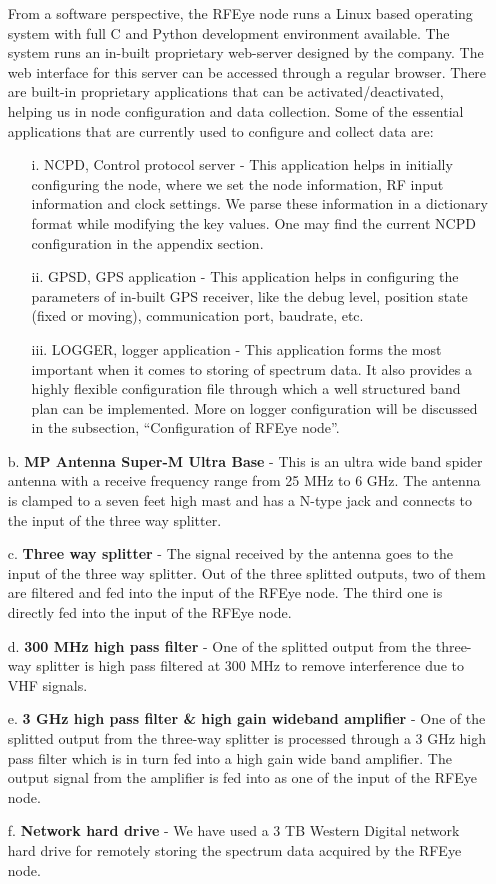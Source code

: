 \documentclass[12pt,sts]{report}
\begin{document}
\begin{enumerate}
	From a software perspective, the RFEye node runs a Linux based operating system with full C and Python development environment available. The system runs an in-built proprietary web-server designed by the company. The web interface for this server can be accessed through a regular browser. There are built-in proprietary applications that can be activated/deactivated, helping us in node configuration and data collection.
	Some of the essential applications that are currently used to configure and collect data are:
	\begin{enumerate}
		\item[i.] NCPD, Control protocol server - This application helps in initially configuring the node, where we set the node information, RF input information and clock settings. We parse these information in a dictionary format while modifying the key values. One may find the current NCPD configuration in the appendix section.
		\item[ii.] GPSD, GPS application - This application helps in configuring the parameters of in-built GPS receiver, like the debug level, position state (fixed or moving), communication port, baudrate, etc.
		\item[iii.] LOGGER, logger application - This application forms the most important when it comes to storing of spectrum data. It also provides a highly flexible configuration file through which a well structured band plan can be implemented. More on logger configuration will be discussed in the subsection, ``Configuration of RFEye node''.
	\end{enumerate}
	
	\item[b.] \textbf{MP Antenna Super-M Ultra Base} - This is an ultra wide band spider antenna with a receive frequency range from 25 MHz to 6 GHz. The antenna is clamped to a seven feet high mast and has a N-type jack and connects to the input of the three way splitter.
	\item[c.] \textbf{Three way splitter} - The signal received by the antenna goes to the input of the three way splitter. Out of the three splitted outputs, two of them are filtered and fed into the input of the RFEye node. The third one is directly fed into the input of the RFEye node. 
	\item[d.] \textbf{300 MHz high pass filter} - One of the splitted output from the three-way splitter is high pass filtered at 300 MHz to remove interference due to VHF signals.
	\item[e.] \textbf{3 GHz high pass filter \& high gain wideband amplifier} - One of the splitted output from the three-way splitter is processed through a 3 GHz high pass filter which is in turn fed into a high gain wide band amplifier. The output signal from the amplifier is fed into as one of the input of the RFEye node.
	\item[f.] \textbf{Network hard drive} - We have used a 3 TB Western Digital network hard drive for remotely storing the spectrum data acquired by the RFEye node.
\end{enumerate}
\end{document}
